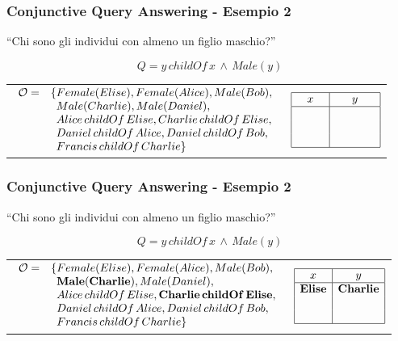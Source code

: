 \documentclass[8pt]{beamer}
\begin{document}
\begin{frame}
\frametitle{Conjunctive Query Answering - Esempio 2}
\begin{center}
``Chi sono gli individui con almeno un figlio maschio?'' 
\end{center}
\[
 Q=y\,childOf\,x\,\wedge\,Male(y)
\]
\vspace{\baselineskip}

\begin{tabular}{lc}
$\begin{array}{cl}
  \Ont  =  &  \{Female(Elise),  Female(Alice), Male(Bob), \\
  &\phantom{\{}Male(Charlie), Male(Daniel), \\
  &\phantom{\{}Alice\,childOf\,Elise, Charlie\,childOf\,Elise, \\
  &\phantom{\{}Daniel\,childOf\,Alice, Daniel\,childOf\,Bob, \\
  &\phantom{\{}Francis\,childOf\,Charlie \}\\
\end{array}$ & 
$\begin{array}{|c|c|}
  \hline
  x & y\\
  \hline
  \phantom{Elise}&\phantom{Charlie}\\
  \phantom{Alice}&\phantom{Daniel}\\
  \phantom{Bob}&\phantom{Daniel}\\
  \hline
\end{array}$ \\
\end{tabular}
\end{frame}

\begin{frame}
\frametitle{Conjunctive Query Answering - Esempio 2}
\begin{center}
``Chi sono gli individui con almeno un figlio maschio?'' 
\end{center}
\[
 Q=y\,childOf\,x\,\wedge\,Male(y)
\]
\vspace{\baselineskip}

\begin{tabular}{lc}
$\begin{array}{cl}
  \Ont  =  &  \{Female(Elise),  Female(Alice), Male(Bob), \\
  &\phantom{\{}\mathbf{Male(Charlie)}, Male(Daniel), \\
  &\phantom{\{}Alice\,childOf\,Elise, \mathbf{Charlie\,childOf\,Elise}, \\
  &\phantom{\{}Daniel\,childOf\,Alice, Daniel\,childOf\,Bob, \\
  &\phantom{\{}Francis\,childOf\,Charlie \}\\
\end{array}$ & 
$\begin{array}{|c|c|}
  \hline
  x & y\\
  \hline
  \mathbf{Elise}&\mathbf{Charlie}\\
  \phantom{Alice}&\phantom{Daniel}\\
  \phantom{Bob}&\phantom{Daniel}\\
  \hline
\end{array}$ \\
\end{tabular}
\end{frame}
\end{document}
